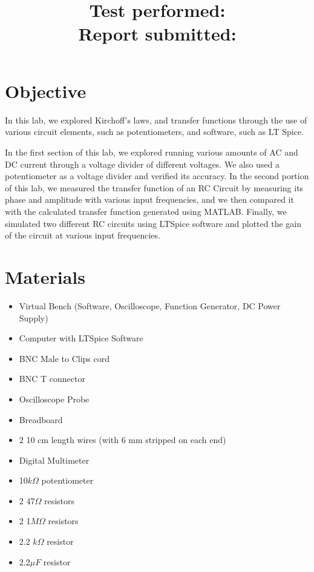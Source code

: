 \documentclass[10pt]{article}
\title{
    \textbf{\courseTitle} \\
    \textbf{\documentTitle} \\
    \bigskip
    \textbf{\large{Test performed: \testDate}} \\
    \textbf{\large{Report submitted: \reportDate}} \\
    \bigskip
    \bigskip
}
\author{\documentAuthor}
\date{}
\begin{document}
\maketitle

\newpage

\section{Objective}

In this lab, we explored Kirchoff's laws, and transfer functions through the use of various circuit elements, such as potentiometers, and software, such as LT Spice.

\medskip
In the first section of this lab, we explored running various amounts of AC and DC current through a voltage divider of different voltages. We also used a potentiometer as a voltage divider and verified its accuracy. In the second portion of this lab, we measured the transfer function of an RC Circuit by measuring its phase and amplitude with various input frequencies, and we then compared it with the calculated transfer function generated using MATLAB. Finally, we simulated two different RC circuits using LTSpice software and plotted the gain of the circuit at various input frequencies. 



\section{Materials}

\begin{itemize}
	\item Virtual Bench (Software, Oscilloscope, Function Generator, DC Power Supply)
	\item Computer with LTSpice Software 
	\item BNC Male to Clips cord
	\item BNC T connector
	\item Oscilloscope Probe
	\item Breadboard
	\item 2 10 cm length wires (with 6 mm stripped on each end)
	\item Digital Multimeter
	\item 10$k\Omega$ potentiometer
	\item 2 47$\Omega$ resistors
	\item 2 1$M\Omega$ resistors
	\item 2.2 $k\Omega$ resistor
	\item 2.2$\mu F$ resistor
	
\end{itemize}
\end{document}
